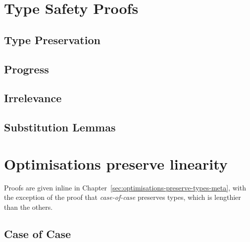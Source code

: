 \documentclass[acmsmall,review]{acmart}
\begin{document}
\section{Type Safety Proofs}

\subsection{Type Preservation\label{sec:proof:type-preservation}}



\subsection{Progress\label{sec:proof:progress}}



\subsection{Irrelevance\label{sec:proof:irrelevance}}



\subsection{Substitution Lemmas\label{sec:proof:substitution-lemmas}}







\section{Optimisations preserve linearity}

Proofs are given inline in Chapter~\ref{sec:optimisations-preserve-types-meta},
with the exception of the proof that \emph{case-of-case} preserves types, which
is lengthier than the others.

\subsection{Case of Case\label{sec:proof:caseofcase}}



\end{document}
